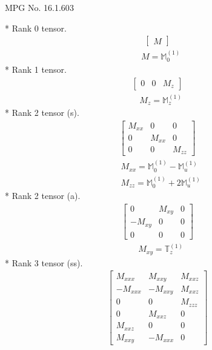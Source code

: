 \documentclass[fleqn,8pt,landscape]{jsarticle}
\begin{document}
\setcounter{MaxMatrixCols}{32}

\renewcommand{\tablename}{Table~}
\renewcommand{\figurename}{Figure~}
\begin{center}
\LARGE
MPG No. 16.1.60\quad$3$
\end{center}
* Rank 0 tensor.
\begin{align*}
\begin{bmatrix} M \end{bmatrix}
\end{align*}
\begin{align*}
& M = \mathbb{M}_{0}^{(1)}
\end{align*}
* Rank 1 tensor.
\begin{align*}
\begin{bmatrix} 0 & 0 & M_{z} \end{bmatrix}
\end{align*}
\begin{align*}
& M_{z} = \mathbb{M}_{z}^{(1)}
\end{align*}
* Rank 2 tensor (s).
\begin{align*}
\begin{bmatrix} M_{xx} & 0 & 0 \\ 0 & M_{xx} & 0 \\ 0 & 0 & M_{zz} \end{bmatrix}
\end{align*}
\begin{align*}
& M_{xx} = \mathbb{M}_{0}^{(1)} - \mathbb{M}_{u}^{(1)} \\
& M_{zz} = \mathbb{M}_{0}^{(1)} + 2 \mathbb{M}_{u}^{(1)}
\end{align*}
* Rank 2 tensor (a).
\begin{align*}
\begin{bmatrix} 0 & M_{xy} & 0 \\ - M_{xy} & 0 & 0 \\ 0 & 0 & 0 \end{bmatrix}
\end{align*}
\begin{align*}
& M_{xy} = \mathbb{T}_{z}^{(1)}
\end{align*}
* Rank 3 tensor (ss).
\begin{align*}
\begin{bmatrix} M_{xxx} & M_{xxy} & M_{xxz} \\ - M_{xxx} & - M_{xxy} & M_{xxz} \\ 0 & 0 & M_{zzz} \\ 0 & M_{xxz} & 0 \\ M_{xxz} & 0 & 0 \\ M_{xxy} & - M_{xxx} & 0 \end{bmatrix}
\end{align*}
\end{document}
